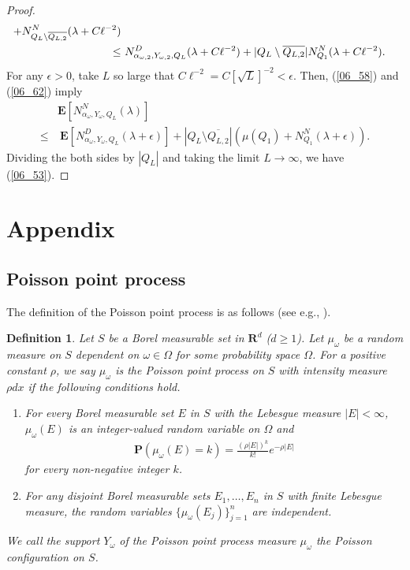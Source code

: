 \documentclass[12pt,a4paper]{article}
\newtheorem{definition}[theorem]{Definition}
\begin{document}
\begin{proof}
\begin{align}
+
 N^N_{Q_L\setminus\overline{Q_{L,2}}}(\lambda+C\ell^{-2})
\notag\\
\leq &\ 
 N^D_{\alpha_{\omega,2},Y_{\omega,2},Q_L}(\lambda+C\ell^{-2})
+
|Q_L\setminus\overline{Q_{L,2}}|
 N^N_{Q_1}(\lambda+C\ell^{-2}).
\label{06_62}
\end{align}
For any $\epsilon>0$, take $L$ so large that 
$C\ell^{-2}=C[\sqrt{L}]^{-2}<\epsilon$.
Then,
(\ref{06_58}) and (\ref{06_62}) imply
\begin{align*}
& \mathbf{E}[ N^N_{\alpha_\omega,Y_\omega,Q_L}(\lambda)]\\
\leq&\ 
\mathbf{E}[ N^D_{\alpha_\omega,Y_\omega,Q_L}(\lambda+\epsilon)]
+
|Q_L\setminus\overline{Q_{L,2}}|(\mu(Q_1)+ N^N_{Q_1}(\lambda+\epsilon)).
\end{align*}
Dividing the both sides by $|Q_L|$ and taking the limit $L\to \infty$,
we have (\ref{06_53}).
\end{proof}





\section{Appendix}
\subsection{Poisson point process}
\label{section_pp}


The definition of the Poisson point process is as follows (see e.g., \cite{Re}).
\begin{definition}
\label{definition_poisson}
Let $S$ be a Borel measurable set in $\mathbf{R}^d$ ($d\geq 1$).
Let $\mu_\omega$ be a random measure on $S$
dependent on $\omega\in \Omega$ for some probability space $\Omega$.
For a positive constant $\rho$,
we say $\mu_\omega$ is the Poisson point process on $S$
with intensity measure $\rho dx$ 
if the following conditions hold.
\begin{enumerate}
 \item For every Borel measurable set $E$ in $S$ 
with the Lebesgue measure $|E|<\infty$, 
$\mu_\omega(E)$ is an integer-valued random variable on $\Omega$ and
\begin{align*}
 \mathbf{P}(\mu_\omega(E)=k)=\frac{(\rho|E|)^k}{k!}e^{-\rho|E|}
\end{align*}
for every non-negative integer $k$.

 \item 
For any disjoint Borel measurable sets $E_1,\ldots,E_n$ in $S$
with finite Lebesgue measure,
the random variables $\{\mu_\omega(E_j)\}_{j=1}^n$
are independent.
\end{enumerate}
We call the support $Y_\omega$
of the Poisson point process measure $\mu_\omega$
the \textit{Poisson configuration on $S$}.
\end{definition}
\end{document}
